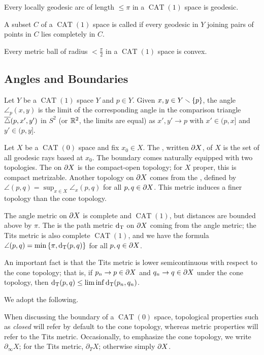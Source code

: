 \documentclass{amsart}
\newcommand{\bdT}{\partial_T}
\newcommand{\bdc}{\partial_{\infty}}
\DeclareMathOperator{\CAT}{CAT}
\begin{document}
\begin{lemma}			\label{local geodesics}
Every locally geodesic arc of length $\le \pi$ in a $\CAT(1)$ space is geodesic. \end{lemma}

A subset $C$ of a $\CAT(1)$ space is called  if every geodesic in $Y$ joining pairs of points in $C$ lies completely in $C$.

\begin{lemma}			\label{convex balls}
Every metric ball of radius $< \frac{\pi}{2}$ in a $\CAT(1)$ space is convex. \end{lemma}

\subsection{Angles and Boundaries}

Let $Y$ be a $\CAT(1)$ space $Y$ and $p \in Y$.  Given $x,y \in Y \smallsetminus \left\{p\right\}$, the angle $\angle_p (x,y)$ is the limit of the corresponding angle in the comparison triangle $\overline{\triangle}(p,x',y')$ in $S^2$ (or $\mathbb{R}^2$, the limits are equal) as $x',y' \to p$ with $x' \in (p,x]$ and $y' \in (p,y]$.

Let $X$ be a $\CAT(0)$ space and fix $x_0 \in X$.
The %
, written $\partial X$, of $X$ is the set of all geodesic rays based at $x_0$.
The boundary comes naturally equipped with two topologies.
The  on $\partial X$ is the compact-open topology; for $X$ proper, this is compact metrizable.
Another topology on $\partial X$ comes from the , defined by $\angle (p,q) = \sup_{x \in X} \angle_x (p,q)$ for all $p,q \in \partial X$.
This metric induces a finer topology than the cone topology.

The angle metric on $\partial X$ is complete and $\CAT(1)$, but distances are bounded above by $\pi$.
The  is the path metric $\operatorname{d_T}$ on $\partial X$ coming from the angle metric; the Tits metric is also complete $\CAT(1)$, and we have the formula $\angle (p,q) = \min \left\{\pi, \operatorname{d_T}(p, q)\right\}$ for all $p,q \in \partial X$.

An important fact is that the Tits metric is lower semicontinuous with respect to the cone topology; that is, if $p_n \to p \in \partial X$ and $q_n \to q \in \partial X$ under the cone topology, then $\operatorname{d_T}(p,q) \le \liminf \operatorname{d_T} (p_n, q_n)$.

We adopt the following.

\begin{convention}
When discussing the boundary of a $\CAT(0)$ space, topological properties such as \emph{closed} will refer by default to the cone topology, whereas metric properties will refer to the Tits metric.
Occasionally, to emphasize the cone topology, we write $\bdc X$; for the Tits metric, $\bdT X$; otherwise simply $\partial X$.
\end{convention}
\end{document}
